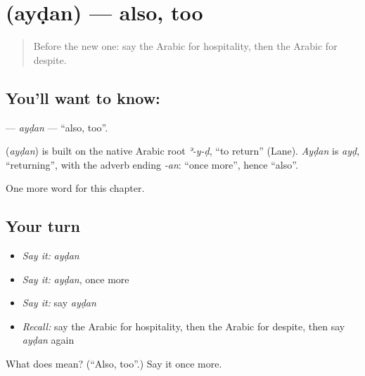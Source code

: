 \section[\texorpdfstring{\ar{أيضا} (ayḍan)}{أيضا (ayḍan)}]{ (ayḍan) — also, too}

\label{lesson:AR-C175-aydan}



\begin{quote}
Before the new one: say the Arabic for hospitality, then the Arabic for despite.
\end{quote}

\subsection*{You'll want to know: }
\textbf{} — \emph{ayḍan} — \textquotedblleft{}also, too\textquotedblright{}.

\begin{cousinweb}
\textbf{} (\emph{ayḍan}) is built on the native Arabic root \emph{ʾ-y-ḍ}, \textquotedblleft{}to return\textquotedblright{} (Lane). \emph{Ayḍan} is \emph{ayḍ}, \textquotedblleft{}returning\textquotedblright{}, with the adverb ending \emph{-an}: \textquotedblleft{}once more\textquotedblright{}, hence \textquotedblleft{}also\textquotedblright{}.
\end{cousinweb}

\begin{grammarlens}[title={What you've built}]
One more word for this chapter.
\end{grammarlens}

\subsection*{Your turn}
\begin{itemize}
\raggedright
  \item \emph{Say it:} \emph{ayḍan}
  \item \emph{Say it:} \emph{ayḍan}, once more
  \item \emph{Say it:} say \emph{ayḍan}
  \item \emph{Recall:} say the Arabic for hospitality, then the Arabic for despite, then say \emph{ayḍan} again
\end{itemize}

\begin{tcolorbox}[breakable,colback=teal!4,colframe=teal!35!black,title={Before you move on}]
What does  mean? (\textquotedblleft{}Also, too\textquotedblright{}.) Say it once more.
\end{tcolorbox}
